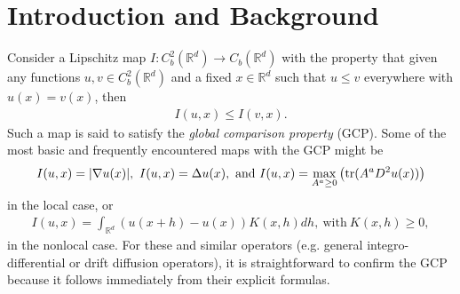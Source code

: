 \documentclass[11pt,reqno]{amsart}
\numberwithin{equation}{section}
\theoremstyle{plain}
\def\real{{\mathbb R}}
\def\grad{\nabla}
\def\Tr{\textnormal{tr}}
\begin{document}
\maketitle







\section{Introduction and Background}\label{sec:Introduction}
\setcounter{equation}{0}




Consider a Lipschitz map $I:C^2_b(\mathbb{R}^d) \to C_b(\mathbb{R}^d)$ with the property that given any functions $u,v\in C^2_b(\mathbb{R}^d)$ and a fixed $x\in \mathbb{R}^d$ such that $u\leq v$ everywhere with $u(x)=v(x)$, then
\begin{align*}
  I(u,x)\leq I(v,x).	
\end{align*}	
Such a map is said to satisfy the \emph{global comparison property} (GCP).  Some of the most basic and frequently encountered maps with the GCP might be 
\begin{align*}
	I(u,x) = |\grad u(x)|,\ 
	I(u,x) = \Delta u(x),\ 
	\text{and}\ 
	I(u,x) = \max_{A^a\geq0}\left( \Tr(A^{a}D^2u(x)) \right)
\end{align*}
in the local case,
or 
\begin{align*}
	I(u,x) = \int_{\real^d}\left(u(x+h)-u(x)\right)K(x,h)dh,\ \text{with}\ K(x,h)\geq 0,
\end{align*}
in the nonlocal case.  For these and similar operators (e.g. general integro-differential or drift diffusion operators), it is straightforward to confirm the GCP because it follows immediately from their explicit formulas.
\end{document}
